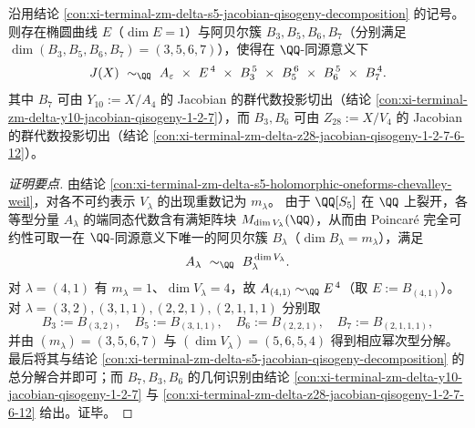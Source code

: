 \begin{conclusion}\label{con:xi-terminal-zm-delta-s5-jacobian-power-isogeny-refinement}
沿用结论 \ref{con:xi-terminal-zm-delta-s5-jacobian-qisogeny-decomposition} 的记号。
则存在椭圆曲线 \(E\)（\(\dim E=1\)）与阿贝尔簇 \(B_3,B_5,B_6,B_7\)（分别满足 \(\dim(B_3,B_5,B_6,B_7)=(3,5,6,7)\)），使得在 \(\QQ\)-同源意义下
\[
J(X)\ \sim_{\QQ}\ A_\varepsilon\ \times\ E^{\,4}\ \times\ B_3^{\,5}\ \times\ B_5^{\,6}\ \times\ B_6^{\,5}\ \times\ B_7^{\,4}.
\]
其中 \(B_7\) 可由 \(Y_{10}:=X/A_4\) 的 Jacobian 的群代数投影切出（结论 \ref{con:xi-terminal-zm-delta-y10-jacobian-qisogeny-1-2-7}），而 \(B_3,B_6\) 可由 \(Z_{28}:=X/V_4\) 的 Jacobian 的群代数投影切出（结论 \ref{con:xi-terminal-zm-delta-z28-jacobian-qisogeny-1-2-7-6-12}）。
\end{conclusion}
\begin{proof}[证明要点]
由结论 \ref{con:xi-terminal-zm-delta-s5-holomorphic-oneforms-chevalley-weil}，对各不可约表示 \(V_\lambda\) 的出现重数记为 \(m_\lambda\)。
由于 \(\QQ[S_5]\) 在 \(\QQ\) 上裂开，各等型分量 \(A_\lambda\) 的端同态代数含有满矩阵块 \(M_{\dim V_\lambda}(\QQ)\)，从而由 Poincar\'e 完全可约性可取一在 \(\QQ\)-同源意义下唯一的阿贝尔簇 \(B_\lambda\)（\(\dim B_\lambda=m_\lambda\)），满足
\[
A_\lambda\ \sim_{\QQ}\ B_\lambda^{\,\dim V_\lambda}.
\]
对 \(\lambda=(4,1)\) 有 \(m_\lambda=1\)、\(\dim V_\lambda=4\)，故 \(A_{(4,1)}\sim_{\QQ}E^{\,4}\)（取 \(E:=B_{(4,1)}\)）。
对 \(\lambda=(3,2),(3,1,1),(2,2,1),(2,1,1,1)\) 分别取
\[
B_3:=B_{(3,2)},\quad B_5:=B_{(3,1,1)},\quad B_6:=B_{(2,2,1)},\quad B_7:=B_{(2,1,1,1)},
\]
并由 \((m_\lambda)=(3,5,6,7)\) 与 \((\dim V_\lambda)=(5,6,5,4)\) 得到相应幂次型分解。
最后将其与结论 \ref{con:xi-terminal-zm-delta-s5-jacobian-qisogeny-decomposition} 的总分解合并即可；而 \(B_7,B_3,B_6\) 的几何识别由结论 \ref{con:xi-terminal-zm-delta-y10-jacobian-qisogeny-1-2-7} 与 \ref{con:xi-terminal-zm-delta-z28-jacobian-qisogeny-1-2-7-6-12} 给出。证毕。
\end{proof}



